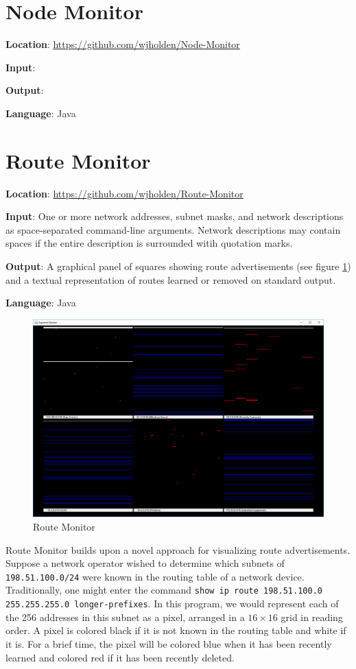 \documentclass[12pt]{article}
\begin{document}
\section{Node Monitor}

\textbf{Location}: \url{https://github.com/wjholden/Node-Monitor}

\textbf{Input}: 

\textbf{Output}: 

\textbf{Language}: Java


\section{Route Monitor}

\textbf{Location}: \url{https://github.com/wjholden/Route-Monitor}

\textbf{Input}: One or more network addresses, subnet masks, and network descriptions as space-separated command-line arguments. Network descriptions may contain spaces if the entire description is surrounded witih quotation marks.

\textbf{Output}: A graphical panel of squares showing route advertisements (see figure \ref{fig:Route-Monitor-1}) and a textual representation of routes learned or removed on standard output.

\textbf{Language}: Java

\begin{figure}[h]
\centering
\includegraphics[width=\textwidth]{Route-Monitor-1}
\caption{Route Monitor}
\label{fig:Route-Monitor-1}
\end{figure}

Route Monitor builds upon a novel approach for visualizing route advertisements. Suppose a network operator wished to determine which subnets of \texttt{198.51.100.0/24} were known in the routing table of a network device. Traditionally, one might enter the command \texttt{show ip route 198.51.100.0 255.255.255.0 longer-prefixes}. In this program, we would represent each of the 256 addresses in this subnet as a pixel, arranged in a $16 \times 16$ grid in reading order. A pixel is colored black if it is not known in the routing table and white if it is. For a brief time, the pixel will be colored blue when it has been recently learned and colored red if it has been recently deleted.
\end{document}
